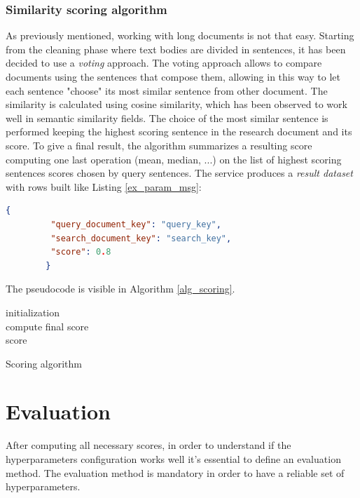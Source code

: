 \documentclass[\main/main.tex]{subfiles}
\begin{document}
\subsubsection{Similarity scoring algorithm}
As previously mentioned, working with long documents is not that easy. Starting from the cleaning phase where text bodies are divided in sentences, it has been decided to use a \emph{voting} approach. The voting approach allows to compare documents using the sentences that compose them, allowing in this way to let each sentence "choose" its most similar sentence from other document. The similarity is calculated using cosine similarity, which has been observed to work well in semantic similarity fields. The choice of the most similar sentence is performed keeping the highest scoring sentence in the research document and its score. To give a final result, the algorithm summarizes a resulting score computing one last operation (mean, median, ...) on the list of highest scoring sentences scores chosen by query sentences. The service produces a \emph{result dataset} with rows built like Listing \ref{ex_param_msg}:
\\
\begin{center}
    \begin{lstlisting}[language=json, caption="Parameter message example", captionpos=b, label={ex_param_msg}]
        {
         "query_document_key": "query_key",
         "search_document_key": "search_key",
         "score": 0.8
        }
    \end{lstlisting}
\end{center}
The pseudocode is visible in Algorithm \ref{alg_scoring}.
\begin{center}
    \begin{algorithm}[H]
     initialization\\
     compute final score\\
     \Return score
     \caption{Scoring algorithm}
     \label{alg_scoring}
    \end{algorithm}
\end{center}

\section{Evaluation}
After computing all necessary scores, in order to understand if the hyperparameters configuration works well it's essential to define an evaluation method. The evaluation method is mandatory in order to have a reliable set of hyperparameters. \\
\end{document}
